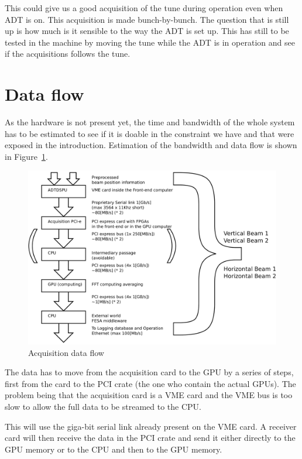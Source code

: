This could give us a good acquisition of the \gls{tune} during operation even when \gls{ADT} is on. This acquisition is made bunch-by-bunch. The question that is still up is how much is it sensible to the way the \gls{ADT} is set up. This has still to be tested in the machine by moving the tune while the \gls{ADT} is in operation and see if the acquisitions follows the tune.

\section{Data flow}

As the hardware is not present yet, the time and bandwidth of the whole system has to be estimated to see if it is doable in the constraint we have and that were exposed in the introduction. Estimation of the bandwidth and data flow is shown in Figure~\ref{fig:data_flow}.

\begin{figure}[H]
\caption{Acquisition data flow}
\label{fig:data_flow}
\centering
\includegraphics[scale=0.3]{dataflow.pdf}
\end{figure}

The data has to move from the acquisition card to the GPU by a series of steps, first from the card to the PCI crate (the one who contain the actual \glspl{GPU}). The problem being that the acquisition card is a \gls{VME} card and the VME bus is too slow to allow the full data to be streamed to the \gls{CPU}. 

This will use the giga-bit serial link already present on the VME card. A receiver card will then receive the data in the PCI crate and send it either directly to the \gls{GPU} memory or to the \gls{CPU} and then to the \gls{GPU} memory. 

